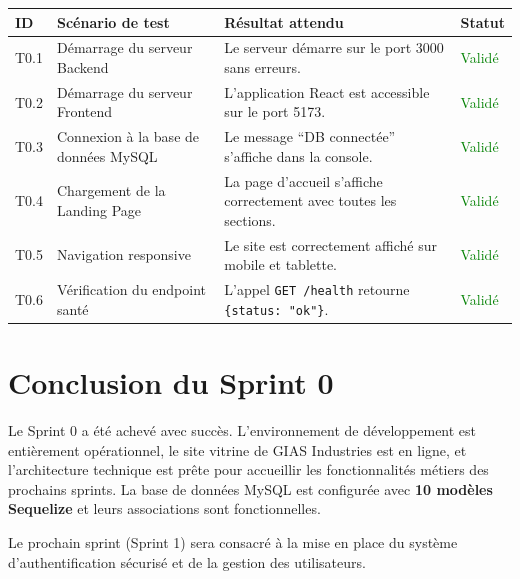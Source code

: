 \begin{center}
\begin{tabular}{|p{1cm}|p{5cm}|p{4cm}|p{3cm}|}
\hline
\textbf{ID} & \textbf{Scénario de test} & \textbf{Résultat attendu} & \textbf{Statut} \\ \hline
T0.1 & Démarrage du serveur Backend & Le serveur démarre sur le port 3000 sans erreurs. & \textcolor{green}{Validé} \\ \hline
T0.2 & Démarrage du serveur Frontend & L'application React est accessible sur le port 5173. & \textcolor{green}{Validé} \\ \hline
T0.3 & Connexion à la base de données MySQL & Le message ``DB connectée'' s'affiche dans la console. & \textcolor{green}{Validé} \\ \hline
T0.4 & Chargement de la Landing Page & La page d'accueil s'affiche correctement avec toutes les sections. & \textcolor{green}{Validé} \\ \hline
T0.5 & Navigation responsive & Le site est correctement affiché sur mobile et tablette. & \textcolor{green}{Validé} \\ \hline
T0.6 & Vérification du endpoint santé & L'appel \texttt{GET /health} retourne \texttt{\{status: "ok"\}}. & \textcolor{green}{Validé} \\ \hline
\end{tabular}
\end{center}

\section{Conclusion du Sprint 0}
Le Sprint 0 a été achevé avec succès. L'environnement de développement est entièrement opérationnel, le site vitrine de GIAS Industries est en ligne, et l'architecture technique est prête pour accueillir les fonctionnalités métiers des prochains sprints. La base de données MySQL est configurée avec \textbf{10 modèles Sequelize} et leurs associations sont fonctionnelles.

Le prochain sprint (Sprint 1) sera consacré à la mise en place du système d'authentification sécurisé et de la gestion des utilisateurs.
